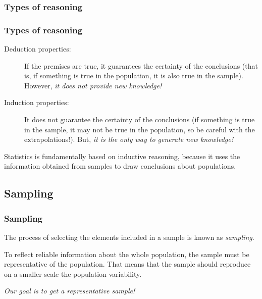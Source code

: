 \begin{frame}
\frametitle{Types of reasoning}

\begin{center}
\resizebox{0.5\textwidth}{!}{}
\end{center}
\end{frame}


\begin{frame}
\frametitle{Types of reasoning}
\begin{description}
\item [Deduction properties:] If the premises are true, it guarantees the certainty of the conclusions (that is, if something is true in the population, it is also true in the sample). 
However, \alert{\emph{it does not provide new knowledge!}} 
\item [Induction properties:] It does not guarantee the certainty of the conclusions (if something is true in the
sample, it may not be true in the population, so be careful with the extrapolations!). 
But, \alert{\emph{it is the only way to generate new knowledge!}}
\end{description}

Statistics is fundamentally based on inductive reasoning, because it uses the information obtained from samples to
draw conclusions about populations.
\end{frame}


\subsection{Sampling}
\begin{frame}
\frametitle{Sampling}
\begin{definition}[Sampling]
The process of selecting the elements included in a sample is known as \emph{sampling}.
\end{definition}
\begin{center}
\resizebox{0.8\textwidth}{!}{}
\end{center}

To reflect reliable information about the whole population, the sample must be representative of the population.
That means that the sample should reproduce on a smaller scale the population variability.  

\begin{center}
\alert{\emph{Our goal is to get a representative sample!}}
\end{center}
\end{frame}


